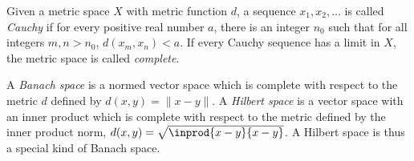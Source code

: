 \begin{defn}[Completeness]
Given a metric space $X$ with metric function $d$, a sequence $x_1, x_2, \ldots$ is called \emph{Cauchy} if for every positive real number $a$, there is an integer $n_0$ such that for all integers $m,n > n_0$, $d(x_m,x_n) < a$. If every Cauchy sequence has a limit in $X$, the metric space is called \emph{complete}.

A \emph{Banach space} is a normed vector space which is complete with respect to the metric $d$ defined by $d(x,y) = \|x - y\|$. A \emph{Hilbert space} is a vector space with an inner product which is complete with respect to the metric defined by the inner product norm, $d(x,y) = \sqrt{\inprod{x-y}{x-y}}$. A Hilbert space is thus a special kind of Banach space.
\end{defn}



